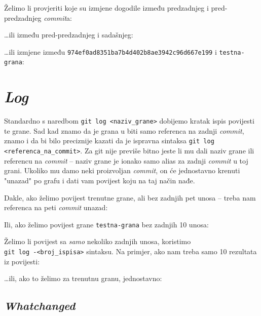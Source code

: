 Želimo li provjeriti koje su izmjene dogodile između predzadnjeg i pred-predzadnjeg \emph{commit}a:


\dots{}ili između pred-predzadnjeg i sadašnjeg:


\dots{}ili izmjene između \verb+974ef0ad8351ba7b4d402b8ae3942c96d667e199+ i \verb+testna-grana+:


\section*{\emph{Log}}

Standardno s naredbom \verb+git log <naziv_grane>+ dobijemo kratak ispis povijesti te grane.
Sad kad znamo da je grana u biti samo referenca na zadnji \emph{commit}, znamo i da bi bilo preciznije kazati da je ispravna sintaksa \verb+git log <referenca_na_commit>+.
Za git nije previše bitno jeste li mu dali naziv grane ili referencu na \emph{commit} -- naziv grane je ionako samo alias za zadnji \emph{commit} u toj grani.
Ukoliko mu damo neki proizvoljan \emph{commit}, on će jednostavno krenuti "unazad" po grafu i dati vam povijest koju na taj način nađe.

Dakle, ako želimo povijest trenutne grane, ali bez zadnjih pet unosa -- treba nam referenca na peti \emph{commit} unazad:


Ili, ako želimo povijest grane \verb+testna-grana+ bez zadnjih 10 unosa:


Želimo li povijest sa \emph{samo} nekoliko zadnjih unosa, koristimo \\\verb+git log -<broj_ispisa>+ sintaksu. 
Na primjer, ako nam treba samo 10 rezultata iz povijesti:


\dots{}ili, ako to želimo za trenutnu granu, jednostavno:


\subsection*{\emph{Whatchanged}}

